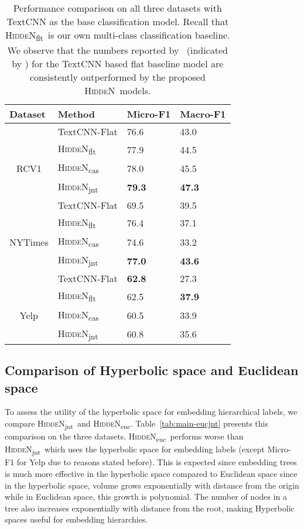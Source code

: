 \documentclass[11pt,a4paper]{article}
\newcommand{\model}{\mbox{\textsc{HiddeN}}}
\newcommand{\modeljnt}{\mbox{\textsc{HiddeN}\textsubscript{jnt}}}
\newcommand{\modelcas}{\mbox{\textsc{HiddeN}\textsubscript{cas}}}
\newcommand{\modelflt}{\mbox{\textsc{HiddeN}\textsubscript{flt}}}
\newcommand{\modeleuc}{\mbox{\textsc{HiddeN}\textsubscript{euc}}}
\begin{document}
\begin{table}[!ht]
\centering
\caption{Performance comparison on all three datasets with TextCNN as the base classification model. Recall that \modelflt\ is our own multi-class classification baseline.
We observe that the numbers reported by~\citet{emnlp} (indicated by ) for the TextCNN based flat baseline model are consistently outperformed by the proposed \model\ models.}
\label{tab:main}
\begin{adjustbox}{max width=0.48\textwidth}
\begin{tabular}{llll} 
\toprule
\multicolumn{1}{l}{Dataset} & Method & Micro-F1 & Macro-F1 \\ 
\toprule
& TextCNN-Flat & 76.6 & 43.0 \\
&\modelflt & 77.9 & 44.5 \\
\multicolumn{1}{c}{RCV1}&\modelcas & 78.0 & 45.5 \\
 & \modeljnt & \textbf{79.3} & \textbf{47.3} \\
\hline\hline
& TextCNN-Flat & 69.5 & 39.5 \\
&\modelflt & 76.4 & 37.1 \\
\multicolumn{1}{c}{NYTimes}& \modelcas & 74.6 & 33.2 \\ 
 & {\modeljnt} & {\textbf{77.0}} & {\textbf{43.6}} \\

\hline\hline
& TextCNN-Flat & \textbf{62.8} & 27.3 \\
&\modelflt & 62.5& \textbf{37.9}\\
\multicolumn{1}{c}{Yelp} & \modelcas  & 60.5 & 33.9\\
 & {\modeljnt } & 60.8 & 35.6 \\

\bottomrule
\end{tabular}
\end{adjustbox}
\end{table}

\subsection{Comparison of Hyperbolic space and Euclidean space}
To assess the utility of the hyperbolic space for embedding hierarchical labels, we compare \modeljnt\ and \modeleuc. Table~\ref{tab:main-eucjnt} presents this comparison on the three datasets. \modeleuc\ performs worse than \modeljnt\ which uses the hyperbolic space for embedding labels (except Micro-F1 for Yelp due to reasons stated before). This is expected since embedding trees is much more effective in the hyperbolic space compared to Euclidean space since in the hyperbolic space, volume grows exponentially with distance from the origin while in Euclidean space, this growth is polynomial. The number of nodes in a tree also increases exponentially with distance from the root, making Hyperbolic spaces useful for embedding hierarchies.
\end{document}
